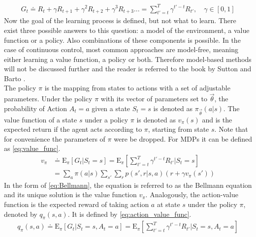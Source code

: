 \begin{align}
	G_t \doteq R_t + \gamma R_{t+1} + \gamma^2 R_{t+2} + \gamma^3 R_{t+3}... = \sum_{t'=t}^{T}\gamma^{t'-t} R_{t'},\quad \gamma \in [0, 1] \label{eq:return}
\end{align}
Now the goal of the learning process is defined, but not what to learn. There exist three possible answers to this question: a model of the environment, a value function or a policy. Also combinations of these components is possible. In the case of continuous control, most common approaches are model-free, meaning either learning a value function, a policy or both. Therefore model-based methods will not be discussed further and the reader is referred to the book by Sutton and Barto \cite{sutton_reinforcement_2018}. \\
The policy $\pi$ is the mapping from states to actions with a set of adjustable parameters. Under the policy $\pi$ with its vector of parameters set to $\vec{\theta}$, the probability of Action $A_t=a$ given a state $S_t=s$ is denoted as $\pi_{\vec{\theta}}(a|s)$. The value function of a state $s$ under a policy $\pi$ is denoted as $v_{\pi}(s)$ and is the expected return if the agent acts according to $\pi$, starting from state $s$. Note that for convenience the parameters of $\pi$ were be dropped. For MDPs it can be defined as \eqref{eq:value_func}. 
\begin{align}
	v_{\pi} &\doteq \mathrm{E}_\pi \left[ G_t \vert S_t=s \right] =
	\mathrm{E}_\pi \left[\sum_{t'=t}^{T}\gamma^{t'-t} R_{t'} \vert S_t=s\right] \label{eq:value_func} \\
	&= \sum_{a} \pi(a \vert s) 
	\sum_{s'} \sum_{r} p(s',r \vert s,a) \left( r + \gamma v_\pi(s') \right) \label{eq:Bellmann}
\end{align}
In the form of \eqref{eq:Bellmann}, the equation is referred to as the Bellmann equation and its unique solution is the value function $v_\pi$. Analogously, the action-value function is the expected reward of taking action $a$ at state $s$ under the policy $\pi$, denoted by $q_\pi(s,a)$. It is defined by \eqref{eq:action_value_func}. \cite[p. 58-59]{sutton_reinforcement_2018}
\begin{align}
	q_\pi(s,a) \doteq \mathrm{E}_\pi \left[ G_t \vert S_t=s, A_t=a \right] =
	\mathrm{E}_\pi \left[\sum_{t'=t}^{T}\gamma^{t'-t} R_{t'} \vert S_t=s, A_t=a\right] \label{eq:action_value_func} 
\end{align}
